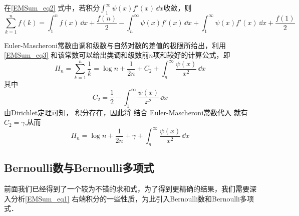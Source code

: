 在\autoref{EMSum_eq2}  式中，若积分$\displaystyle{\int_{1}^{\infty}\psi(x)f'(x)\,\dd x}$收敛，则
\begin{equation}\label{EMSum_eq3}
    \sum_{k=1}^{n}f(k)=\int_{1}^{n}f(x)\,\dd x
    +\frac{f(n)}{2}-\int_{n}^{\infty}\psi(x)f'(x)\,\dd x
    +\int_{1}^{\infty}\psi(x)f'(x)\,\dd x+\frac{f(1)}{2}
\end{equation}
\begin{example}{}
Euler-Mascheroni常数由调和级数与自然对数的差值的极限所给出，利用\autoref{EMSum_eq3} 和该常数可以给出类调和级数前$n$项和较好的计算公式，即
\begin{equation}
    H_{n}=\sum_{k=1}^{n}\frac{1}{k}=\log n+\frac{1}{2n}+C_{2}
    +\int_{n}^{\infty}\frac{\psi(x)}{x^2}\,\dd x
\end{equation}
其中
\begin{equation}
    C_{2}=\frac{1}{2}-\int_{1}^{\infty}\frac{\psi(x)}{x^2}\,\dd x
\end{equation}
由Dirichlet定理可知， 积分存在，因此将 结合
Euler-Mascheroni常数代入 就有$C_{2}=\gamma$,从而
\begin{equation}
    H_{n}=\log n+\frac{1}{2n}+\gamma+\int_{n}^{\infty}\frac{\psi(x)}{x^2}\,\dd x
\end{equation}
\end{example}

\subsection{Bernoulli数与Bernoulli多项式}

前面我们已经得到了一个较为不错的求和式，为了得到更精确的结果，我们需要深入分析\autoref{EMSum_eq1} 右端积分的一些性质，为此引入Bernoulli数和Bernoulli多项式．

